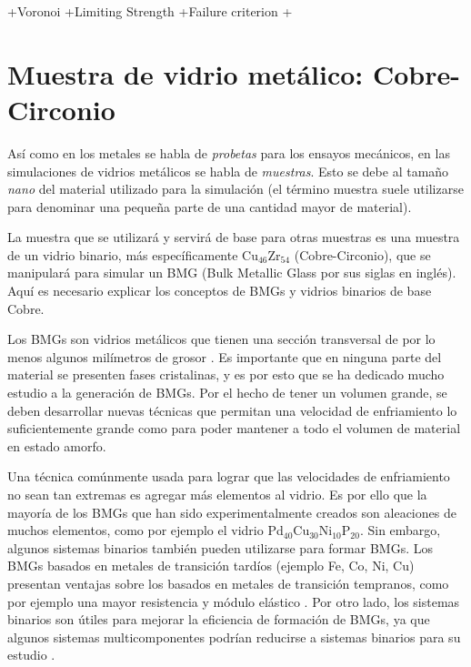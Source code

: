 +Voronoi
+Limiting Strength
+Failure criterion
+


\section{Muestra de vidrio metálico: Cobre-Circonio}
\label{S1_3}

Así como en los metales se habla de \textit{probetas} para los ensayos mecánicos, en las simulaciones de vidrios metálicos se habla de \textit{muestras}. Esto se debe al tamaño \textit{nano} del material utilizado para la simulación (el término muestra suele utilizarse para denominar una pequeña parte de una cantidad mayor de material).

La muestra que se utilizará y servirá de base para otras muestras es una muestra de un vidrio binario, más específicamente Cu$_{46}$Zr$_{54}$ (Cobre-Circonio), que se manipulará para simular un BMG (Bulk Metallic Glass por sus siglas en inglés). Aquí es necesario explicar los conceptos de BMGs y vidrios binarios de base Cobre.

Los BMGs son vidrios metálicos que tienen una sección transversal de por lo menos algunos milímetros de grosor \citep{suryana11}. Es importante que en ninguna parte del material se presenten fases cristalinas, y es por esto que se ha dedicado mucho estudio a la generación de BMGs. Por el hecho de tener un volumen grande, se deben desarrollar nuevas técnicas que permitan una velocidad de enfriamiento lo suficientemente grande como para poder mantener a todo el volumen de material en estado amorfo.

Una técnica comúnmente usada para lograr que las velocidades de enfriamiento no sean tan extremas es agregar más elementos al vidrio. Es por ello que la mayoría de los BMGs que han sido experimentalmente creados son aleaciones de muchos elementos, como por ejemplo el vidrio Pd$_{40}$Cu$_{30}$Ni$_{10}$P$_{20}$. Sin embargo, algunos sistemas binarios también pueden utilizarse para formar BMGs. Los BMGs basados en metales de transición tardíos (ejemplo Fe, Co, Ni, Cu) presentan ventajas sobre los basados en metales de transición tempranos, como por ejemplo una mayor resistencia y módulo elástico \citep{Xu04}. Por otro lado, los sistemas binarios son útiles para mejorar la eficiencia de formación de BMGs, ya que algunos sistemas multicomponentes podrían reducirse a sistemas binarios para su estudio \citep{Duan05}.

